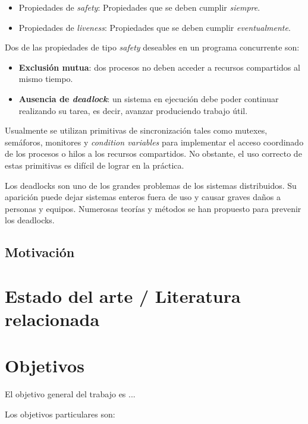 \documentclass[12pt]{article}
\begin{document}
\begin{itemize}
    \item Propiedades de \textit{safety}: Propiedades que se deben cumplir \textit{siempre}.
    \item Propiedades de \textit{liveness}: Propiedades que se deben cumplir \textit{eventualmente}.
\end{itemize}

Dos de las propiedades de tipo \textit{safety} deseables en un programa concurrente son:

\begin{itemize}
    \item \textbf{Exclusión mutua}: dos procesos no deben acceder a recursos compartidos al mismo tiempo.
    \item \textbf{Ausencia de \textit{deadlock}}: un sistema en ejecución debe poder continuar realizando su tarea, es decir, avanzar produciendo trabajo útil.
\end{itemize}

Usualmente se utilizan primitivas de sincronización tales como mutexes, semáforos, monitores y \textit{condition variables}
para implementar el acceso coordinado de los procesos o hilos a los recursos compartidos. No obstante, el uso correcto de estas primitivas es difícil de lograr en la práctica.

Los deadlocks son uno de los grandes problemas de los sistemas distribuidos.
Su aparición puede dejar sistemas enteros fuera de uso y causar graves daños a personas y equipos.
Numerosas teorías y métodos se han propuesto para prevenir los deadlocks.

\subsection{Motivación}

\bigskip

\section{Estado del arte / Literatura relacionada}

\bigskip

\section{Objetivos}

El objetivo general del trabajo es ...

Los objetivos particulares son:
\end{document}
